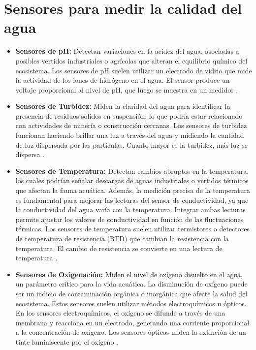 \section{Sensores para medir la calidad del agua}
 \begin{itemize}
    
        \item \textbf{Sensores de pH:} Detectan variaciones en la acidez del agua, asociadas a posibles vertidos industriales o agrícolas que alteran el equilibrio químico del ecosistema. Los sensores de pH suelen utilizar un electrodo de vidrio que mide la actividad de los iones de hidrógeno en el agua. El sensor produce un voltaje proporcional al nivel de pH, que luego se muestra en un medidor \cite{waterQualitySensors}.
        
        \item \textbf{Sensores de Turbidez:} Miden la claridad del agua para identificar la presencia de residuos sólidos en suspensión, lo que podría estar relacionado con actividades de minería o construcción cercanas.
        Los sensores de turbidez funcionan haciendo brillar una luz a través del agua y midiendo la cantidad de luz dispersada por las partículas. Cuanto mayor es la turbidez, más luz se dispersa \cite{waterQualitySensors}.
        
        \item \textbf{Sensores de Temperatura:} Detectan cambios abruptos en la temperatura, los cuales podrían señalar descargas de aguas industriales o vertidos térmicos que afectan la fauna acuática. Además, la medición precisa de la temperatura es fundamental para mejorar las lecturas del sensor de conductividad, ya que la conductividad del agua varía con la temperatura. Integrar ambas lecturas permite ajustar los valores de conductividad en función de las fluctuaciones térmicas.
        Los sensores de temperatura suelen utilizar termistores o detectores de temperatura de resistencia (RTD) que cambian la resistencia con la temperatura. El cambio de resistencia se convierte en una lectura de temperatura \cite{waterQualitySensors}.
        
        \item \textbf{Sensores de Oxigenación:} Miden el nivel de oxígeno disuelto en el agua, un parámetro crítico para la vida acuática. La disminución de oxígeno puede ser un indicio de contaminación orgánica o inorgánica que afecte la salud del ecosistema. 
        Estos sensores suelen utilizar métodos electroquímicos u ópticos. En los sensores electroquímicos, el oxígeno se difunde a través de una membrana y reacciona en un electrodo, generando una corriente proporcional a la concentración de oxígeno. Los sensores ópticos miden la extinción de un tinte luminiscente por el oxígeno \cite{waterQualitySensors}.


\end{itemize}
